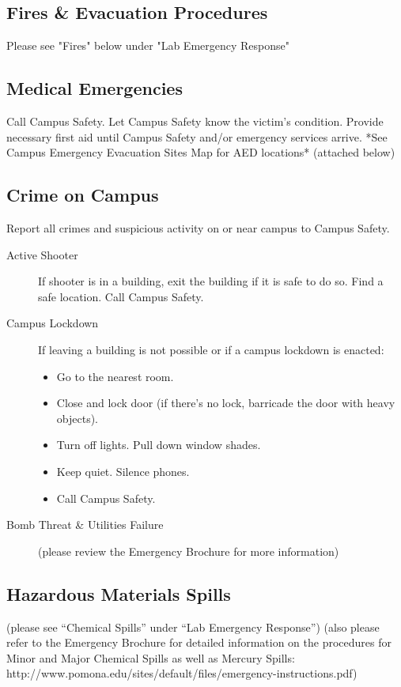 \documentclass[12pt]{../SOP2}
\begin{document}
\subsection{Fires \& Evacuation Procedures}

Please see "Fires" below under "Lab Emergency Response"

\subsection{Medical Emergencies}

Call Campus Safety. Let Campus Safety know the victim's condition. 
Provide necessary first aid until Campus Safety and/or emergency services arrive.
	*See Campus Emergency Evacuation Sites Map for AED locations* (attached below) 

\subsection{Crime on Campus}
	Report all crimes and suspicious activity on or near campus to Campus Safety.

\begin{description}
  \item[Active Shooter]If shooter is in a building, exit the building if it is safe to do so. Find a safe location. Call Campus Safety.
  \item[Campus Lockdown] If leaving a building is not possible or if a campus lockdown is enacted:
\begin{itemize}
  \item Go to the nearest room.
  \item Close and lock door (if there’s no lock, barricade the door with heavy objects).
  \item Turn off lights. Pull down window shades.
  \item Keep quiet. Silence phones.
  \item Call Campus Safety.
\end{itemize}
  \item[Bomb Threat \& Utilities Failure](please review the Emergency Brochure for more information)
\end{description}

\subsection{Hazardous Materials Spills}

(please see “Chemical Spills” under “Lab Emergency Response”) (also please refer to the Emergency Brochure for detailed information on the procedures for Minor and Major Chemical Spills as well as Mercury Spills: http://www.pomona.edu/sites/default/files/emergency-instructions.pdf)
\end{document}
